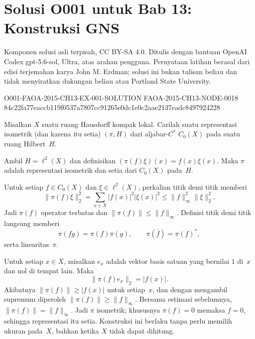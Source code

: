 
\section*{Solusi O001 untuk Bab 13: Konstruksi GNS}
\begin{center}
\small
Komponen solusi asli terpisah, CC BY-SA 4.0. Ditulis dengan bantuan
OpenAI Codex gpt-5.6-sol, Ultra, atas arahan pengguna. Pernyataan latihan
berasal dari edisi terjemahan karya John M. Erdman; solusi ini bukan tulisan
beliau dan tidak menyiratkan dukungan beliau atau Portland State University.
\end{center}

\begin{o001solution}
  {O001-FAOA-2015-CH13-EX-001-SOLUTION}
  {FAOA-2015-CH13-NODE-0018}
  {84c22fa77eaccb119f0537a7807cc91265e0dc1e0c2aae2137eadc8497924228}
\begin{o001statement}
Misalkan $X$ suatu ruang Hausdorff kompak lokal. Carilah suatu representasi
isometrik (dan karena itu setia) $(\pi,H)$ dari aljabar-$C^*$ $C_0(X)$ pada suatu
ruang Hilbert~$H$.
\end{o001statement}
\begin{o001answer}
Ambil $H=\ell^2(X)$ dan definisikan
$(\pi(f)\xi)(x)=f(x)\xi(x)$. Maka $\pi$ adalah representasi isometrik dan
setia dari $C_0(X)$ pada~$H$.
\end{o001answer}
\begin{o001proof}
Untuk setiap $f\in C_0(X)$ dan $\xi\in\ell^2(X)$, perkalian titik demi titik
memberi
\[
 \|\pi(f)\xi\|_2^2
 =\sum_{x\in X}|f(x)|^2|\xi(x)|^2
 \leq\|f\|_\infty^2\|\xi\|_2^2.
\]
Jadi $\pi(f)$ operator terbatas dan $\|\pi(f)\|\leq\|f\|_\infty$. Definisi
titik demi titik langsung memberi
\[
 \pi(fg)=\pi(f)\pi(g),
 \qquad
 \pi(\overline f)=\pi(f)^*,
\]
serta linearitas~$\pi$.

Untuk setiap $x\in X$, misalkan $e_x$ adalah vektor basis satuan yang bernilai
$1$ di~$x$ dan nol di tempat lain. Maka
\[
 \|\pi(f)e_x\|_2=|f(x)|.
\]
Akibatnya $\|\pi(f)\|\geq |f(x)|$ untuk setiap~$x$, dan dengan mengambil
supremum diperoleh $\|\pi(f)\|\geq\|f\|_\infty$. Bersama estimasi sebelumnya,
$\|\pi(f)\|=\|f\|_\infty$. Jadi $\pi$ isometrik; khususnya
$\pi(f)=0$ memaksa $f=0$, sehingga representasi itu setia. Konstruksi ini
berlaku tanpa perlu memilih ukuran pada~$X$, bahkan ketika $X$ tidak dapat
dihitung.
\end{o001proof}
\end{o001solution}
